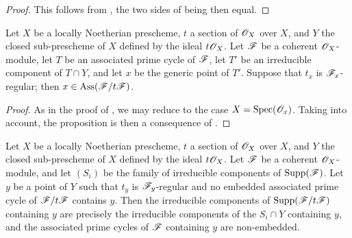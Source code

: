 \begin{proof}
This follows from , the two sides of  being then equal.
\end{proof}

\begin{proposition}[3.4.3]
\label{IV.3.4.3}
Let $X$ be a locally Noetherian prescheme, $t$ a section of $\mathscr{O}_X$ over $X$, and $Y$ the closed sub-prescheme of $X$ defined by the ideal $t\mathscr{O}_X$.
Let $\mathscr{F}$ be a coherent $\mathscr{O}_X$-module, let $T$ be an associated prime cycle of $\mathscr{F}$, let $T'$ be an irreducible component of $T\cap Y$, and let $x$ be the generic point of $T'$.
Suppose that $t_x$ is $\mathscr{F}_x$-regular; then $x\in\operatorname{Ass}(\mathscr{F}/t\mathscr{F})$.
\end{proposition}

\begin{proof}
As in the proof of , we may reduce to the case $X=\operatorname{Spec}(\mathscr{O}_x)$.
Taking  into account, the proposition is then a consequence of .
\end{proof}

\begin{proposition}[3.4.4]
\label{IV.3.4.4}
Let $X$ be a locally Noetherian prescheme, $t$ a section of $\mathscr{O}_X$ over $X$, and $Y$ the closed sub-prescheme of $X$ defined by the ideal $t\mathscr{O}_X$.
Let $\mathscr{F}$ be a coherent $\mathscr{O}_X$-module, and let $(S_i)$ be the family of irreducible components of $\operatorname{Supp}(\mathscr{F})$.
Let $y$ be a point of $Y$ such that $t_y$ is $\mathscr{F}_y$-regular and no embedded associated prime cycle of $\mathscr{F}/t\mathscr{F}$ contains $y$.
Then the irreducible components of $\operatorname{Supp}(\mathscr{F}/t\mathscr{F})$ containing $y$ are precisely the irreducible components of the $S_i\cap Y$ containing $y$, and the associated prime cycles of $\mathscr{F}$ containing $y$ are non-embedded.
\end{proposition}

